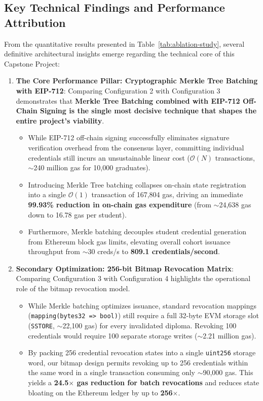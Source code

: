 \subsection{Key Technical Findings and Performance Attribution}

From the quantitative results presented in Table~\ref{tab:ablation-study}, several definitive architectural insights emerge regarding the technical core of this Capstone Project:

\begin{enumerate}
    \item \textbf{The Core Performance Pillar: Cryptographic Merkle Tree Batching with EIP-712}:
    Comparing Configuration 2 with Configuration 3 demonstrates that \textbf{Merkle Tree Batching combined with EIP-712 Off-Chain Signing is the single most decisive technique that shapes the entire project's viability}. 
    \begin{itemize}
        \item While EIP-712 off-chain signing successfully eliminates signature verification overhead from the consensus layer, committing individual credentials still incurs an unsustainable linear cost ($\mathcal{O}(N)$ transactions, $\sim$240 million gas for 10,000 graduates).
        \item Introducing Merkle Tree batching collapses on-chain state registration into a single $\mathcal{O}(1)$ transaction of 167,804 gas, driving an immediate \textbf{99.93\% reduction in on-chain gas expenditure} (from $\sim$24,638 gas down to 16.78 gas per student).
        \item Furthermore, Merkle batching decouples student credential generation from Ethereum block gas limits, elevating overall cohort issuance throughput from $\sim$30 creds/s to \textbf{809.1 credentials/second}.
    \end{itemize}
    
    \item \textbf{Secondary Optimization: 256-bit Bitmap Revocation Matrix}:
    Comparing Configuration 3 with Configuration 4 highlights the operational role of the bitmap revocation model.
    \begin{itemize}
        \item While Merkle batching optimizes issuance, standard revocation mappings (\texttt{mapping(bytes32 => bool)}) still require a full 32-byte EVM storage slot (\texttt{SSTORE}, $\sim$22,100 gas) for every invalidated diploma. Revoking 100 credentials would require 100 separate storage writes ($\sim$2.21 million gas).
        \item By packing 256 credential revocation states into a single \texttt{uint256} storage word, our bitmap design permits revoking up to 256 credentials within the same word in a single transaction consuming only $\sim$90,000 gas. This yields a \textbf{24.5$\times$ gas reduction for batch revocations} and reduces state bloating on the Ethereum ledger by up to \textbf{256$\times$}.
    \end{itemize}


\end{enumerate}
